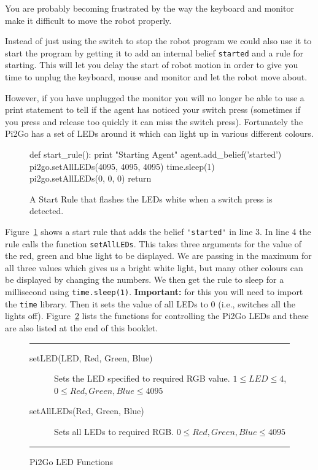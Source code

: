 \documentclass[a4,12pt]{article}
\begin{document}
You are probably becoming frustrated by the way the keyboard and monitor make it difficult to move the robot properly.  

Instead of just using the switch to stop the robot program we could also use it to start the program by getting it to add an internal belief \lstinline{started} and a rule for starting.  This will let you delay the start of robot motion in order to give you time to unplug the keyboard, mouse and monitor and let the robot move about.

However, if you have unplugged the monitor you will no longer be able to use a print statement to tell if the agent has noticed your switch press (sometimes if you press and release too quickly it can miss the switch press).  Fortunately the Pi2Go has a set of LEDs around it which can light up in various different colours.

\begin{figure}[htbp]
\begin{pythonlisting}
def start_rule():
	print "Starting Agent"
	agent.add_belief('started')
	pi2go.setAllLEDs(4095, 4095, 4095)
	time.sleep(1)
	pi2go.setAllLEDs(0, 0, 0)
	return
\end{pythonlisting}
\caption{A Start Rule that flashes the LEDs white when a switch press is detected.}
\label{code:start_rule}
\end{figure}

Figure~\ref{code:start_rule} shows a start rule that adds the belief \lstinline{'started'} in line 3.  In line 4 the rule calls the function \lstinline{setAllLEDs}.  This takes three arguments for the value of the red, green and blue light to be displayed.  We are passing in the maximum for all three values which gives us a bright white light, but many other colours can be displayed by changing the numbers.  We then get the rule to sleep for a millisecond using \lstinline{time.sleep(1)}. {\bf Important:} for this you will need to import the \lstinline{time} library.  Then it sets the value of all LEDs to 0 (i.e., switches all the lights off).  Figure~\ref{fig:leds} lists the functions for controlling the Pi2Go LEDs and these are also listed at the end of this booklet.

\begin{figure}[htbp]
\hrule
\begin{description}
\item[setLED(LED, Red, Green, Blue)] Sets the LED specified to required RGB value.  $1 \leq LED \leq 4$, $0 \leq Red, Green, Blue \leq 4095$
\item[setAllLEDs(Red, Green, Blue)] Sets all LEDs to required RGB.   $0 \leq Red, Green, Blue \leq 4095$
\end{description}
\hrule
\caption{Pi2Go LED Functions}
\label{fig:leds}
\end{figure}
\end{document}
